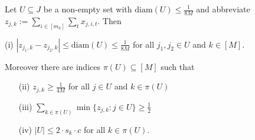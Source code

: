   
  
  \begin{lemma}
  \label{lem:StrongerRSmallNeighborhoodOfClosePoints}
  Let $U \subseteq J$ be a non-empty set with $\textrm{diam}(U) \leq \frac{1}{8M}$ and abbreviate $z_{j,k} := \sum_{i \in [m_k]} \sum_{t} x_{j,i,t}$. Then
  \begin{enumerate*}
     \item[(i)] $|z_{j_1,k} - z_{j_2,k}| \leq \textrm{diam}(U) \leq
  \frac{1}{8M}$ for all $j_1,j_2 \in U$ and $k \in [M]$.
     \end{enumerate*}
     Moreover there are indices $\pi(U) \subseteq [M]$ such that
     \begin{enumerate}
     \item[(ii)] $z_{j,k} \geq \frac{1}{4M}$ for all $j \in U$ and $k \in \pi(U)$
     \item[(iii)] $\sum_{k \in \pi(U)} \min\{ z_{j,k} : j \in U\}
  \geq \frac{1}{2}$
     \item[(iv)] $|U| \leq 2 \cdot s_k \cdot c$ for all $k \in \pi(U)$.
     \end{enumerate}
  \end{lemma}
  
